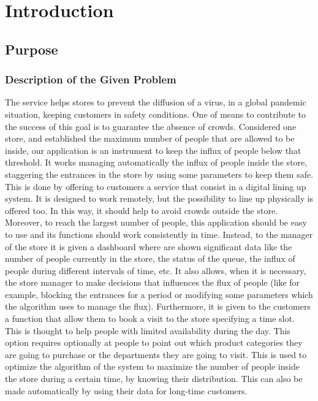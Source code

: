 \chapter{Introduction}


\section{Purpose}

\subsection{Description of the Given Problem}

The service helps stores to prevent the diffusion of a virus, in a global pandemic situation, keeping customers in safety conditions.
One of means to contribute to the success of this goal is to guarantee the absence of crowds.
Considered one store, and established the maximum number of people that are allowed to be inside, our application is an instrument to keep the influx of people below that threshold.
It works managing automatically the influx of people inside the store, staggering the entrances in the store by using some parameters to keep them safe.
This is done by offering to customers a service that consist in a digital lining up system. It is designed to work remotely, but the possibility to line up physically is offered too. In this way, it should help to avoid crowds outside the store.
Moreover, to reach the largest number of people, this application should be easy to use and its functions should work consistently in time.
Instead, to the manager of the store it is given a dashboard where are shown significant data like the number of people currently in the store, the status of the queue, the influx of people during different intervals of time, etc. It also allows, when it is necessary, the store manager to make decisions that influences the flux of people (like for example, blocking the entrances for a period or modifying some parameters which the algorithm uses to manage the flux).
Furthermore, it is given to the customers a function that allow them to book a visit to the store specifying a time slot. This is thought to help people with limited availability during the day.
This option requires optionally at people to point out which product categories they are going to purchase or the departments they are going to visit. This is used to optimize the algorithm of the system to maximize the number of people inside the store during a certain time, by knowing their distribution. This can also be made automatically by using their data for long-time customers.

